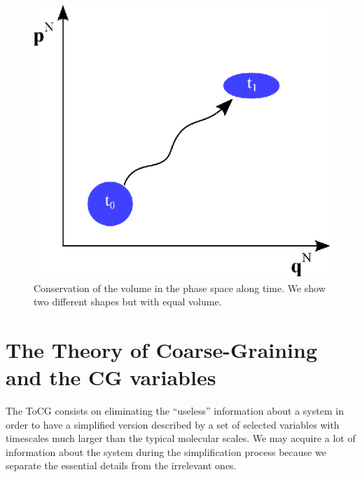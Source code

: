\documentclass[b5paper,openright,10pt]{book}
\begin{document}
\begin{figure}
    \centering
    \includegraphics[scale=0.9]{Liouville}
    \caption[Representation of the Liouville theorem]{Conservation of the volume in the phase space along time. We show two different shapes but with equal volume.}
    \label{fig:LiouvilleTh}
\end{figure}


%
%
\section{The Theory of Coarse-Graining and the CG variables}
The ToCG consists on eliminating the ``useless'' information about a system in order to have a simplified version described by a set of selected variables with timescales much larger than the typical molecular scales. 
We may acquire a lot of information about the system during the simplification process because we separate the essential details from the irrelevant ones. 
\end{document}
